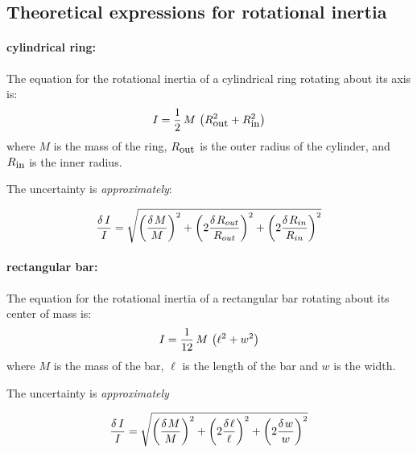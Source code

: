 \subsection*{Theoretical expressions for rotational inertia}

\paragraph*{cylindrical ring:}
The equation for the rotational inertia of a
cylindrical ring rotating about its axis is:
\begin{equation}
I = {{1} \over {2}} \, M \, \left( R_{\mbox{{\small out}}}^{2} +
    R_{\mbox{{\small in}}}^{2}
    \right)    \label{eq:rot2}
\end{equation}
where $M$ is the mass of the ring, $R_{\mbox{{\small out}}}$ is the
outer radius of
the cylinder, and $R_{\mbox{{\small in}}}$ is the inner radius.

The uncertainty is {\em approximately}:

$${{\delta \,I} \over I}=\sqrt {\left( {{{\delta \kern 1pt M} \over M}} \right)^2+\left( {2{{\delta \kern 1pt R_{out}} \over {R_{out}}}} \right)^2+\left( {2{{\delta \kern 1pt R_{in}} \over {R_{in}}}} \right)^2}$$

\paragraph*{rectangular bar:}
The  equation for
the rotational inertia of a rectangular bar rotating about its center
of mass is: \begin{equation}
I = {{1} \over {12}} \, M \, \left( \ell^{2} + w^{2}  \right)
       \label{eq:rot3}
\end{equation}
where $M$ is the mass of the bar, $\ell$ is the length of the bar and $w$
is the width.

The uncertainty is {\em approximately}

$${{\delta \,I} \over I}=\sqrt {\left( {{{\delta \kern 1pt M} \over M}} \right)^2+\left( {2{{\delta \kern 1pt \ell } \over \ell }} \right)^2+\left( {2{{\delta \kern 1pt w} \over w}} \right)^2}$$


